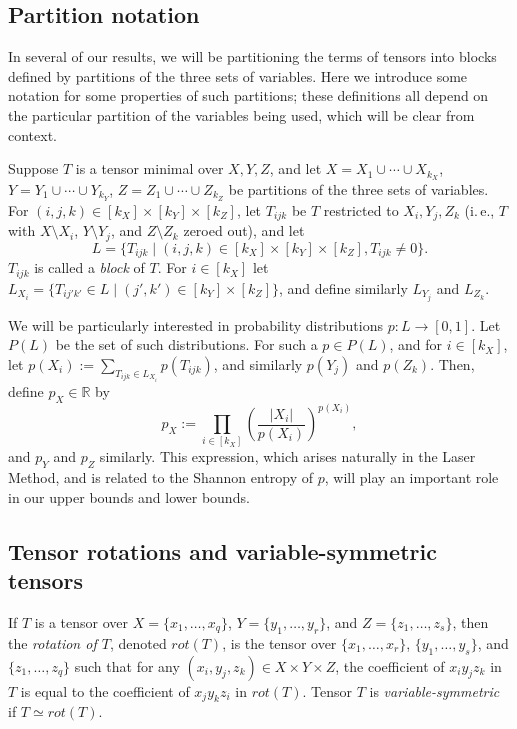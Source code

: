 \documentclass[11pt]{article}
\numberwithin{equation}{section}
\theoremstyle{definition}
\theoremstyle{plain}
\newcommand{\R}{\mathbb R}
\newcommand{\ie}{i.\,e.}
\theoremstyle{definition}
\begin{document}
%
\subsection{Partition notation} \label{partitionnotation}

In 
%
%
several  %
of our results, we will be partitioning the terms of tensors into blocks defined by partitions of the three
%
sets of variables.   %
Here we introduce some notation for some properties of such partitions; these definitions all depend on the particular partition of the variables being used, which will be clear from context.

Suppose $T$ is a tensor minimal over $X,Y,Z$, and let $X = X_1 \cup \cdots \cup X_{k_X}$, $Y = Y_1 \cup \cdots \cup Y_{k_Y}$, $Z = Z_1 \cup \cdots \cup Z_{k_Z}$ be partitions of the three 
%
sets of variables. For $(i,j,k) \in [k_X]\times[k_Y]\times[k_Z]$, let $T_{ijk}$ be $T$ restricted to $X_i, Y_j, Z_k$ (\ie, $T$ with $X \setminus X_i$, $Y \setminus Y_j$, and $Z \setminus Z_k$ zeroed out), and let
\[
  L = \{ T_{ijk} \mid (i,j,k) \in [k_X]\times[k_Y]\times[k_Z], T_{ijk} \neq 0\}.
\]
$T_{ijk}$ is called a \emph{block} of $T$. For $i \in [k_X]$ let $L_{X_i} = \{ T_{ij'k'} \in L \mid (j',k') \in  [k_Y] \times [k_Z]\}$, and define similarly $L_{Y_j}$ and $L_{Z_k}$.

We will be particularly interested in probability distributions $p : L \to [0,1]$. Let $P(L)$ be the set of such distributions. For such a $p \in P(L)$, and for $i \in [k_X]$, let $p(X_i) := \sum_{T_{ijk} \in L_{X_i}} p(T_{ijk})$, and similarly $p(Y_j)$ and $p(Z_k)$. Then, define $p_X \in \R$ by
$$p_X := \prod_{i \in [k_X]} \left( \frac{|X_i|}{p(X_i)}\right)^{p(X_i)},$$
and $p_Y$ and $p_Z$ similarly. This expression, which arises naturally in the Laser Method, and is related to the Shannon entropy of $p$, will play an important role in our upper bounds and lower bounds.

%
\subsection{Tensor rotations and variable-symmetric tensors} \label{symmetricnotation}

If $T$ is a tensor over $X = \{x_1, \ldots, x_q\}$, $Y = \{y_1, \ldots, y_r\}$, and $Z = \{z_1, \ldots, z_s \}$, then the \emph{rotation of $T$}, denoted $rot(T)$, is the tensor over $\{x_1, \ldots, x_r\}$, $\{y_1, \ldots, y_s\}$, and $\{z_1, \ldots, z_q \}$ such that for any $(x_i, y_j, z_k) \in X \times Y \times Z$, the coefficient of $x_i y_j z_k$ in $T$ is equal to the coefficient of $x_j y_k z_i$ in $rot(T)$. Tensor $T$ is \emph{variable-symmetric} if $T \simeq rot(T)$.
\end{document}
